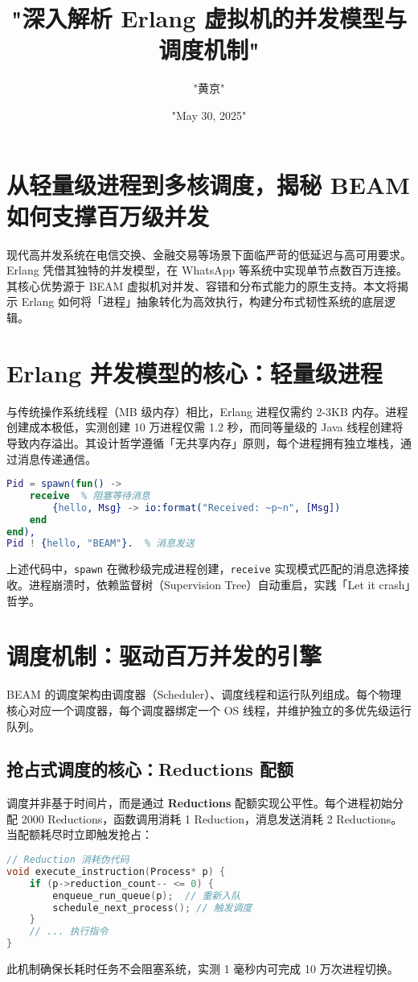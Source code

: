 \title{"深入解析 Erlang 虚拟机的并发模型与调度机制"}
\author{"黄京"}
\date{"May 30, 2025"}
\maketitle
\chapter{从轻量级进程到多核调度，揭秘 BEAM 如何支撑百万级并发}
现代高并发系统在电信交换、金融交易等场景下面临严苛的低延迟与高可用要求。Erlang 凭借其独特的并发模型，在 WhatsApp 等系统中实现单节点数百万连接。其核心优势源于 BEAM 虚拟机对并发、容错和分布式能力的原生支持。本文将揭示 Erlang 如何将「进程」抽象转化为高效执行，构建分布式韧性系统的底层逻辑。\par
\chapter{Erlang 并发模型的核心：轻量级进程}
与传统操作系统线程（MB 级内存）相比，Erlang 进程仅需约 2-3KB 内存。进程创建成本极低，实测创建 10 万进程仅需 1.2 秒，而同等量级的 Java 线程创建将导致内存溢出。其设计哲学遵循「无共享内存」原则，每个进程拥有独立堆栈，通过消息传递通信。\par
\begin{lstlisting}[language=erlang]
% 进程创建示例
Pid = spawn(fun() -> 
    receive  % 阻塞等待消息
        {hello, Msg} -> io:format("Received: ~p~n", [Msg])
    end
end),
Pid ! {hello, "BEAM"}.  % 消息发送
\end{lstlisting}
上述代码中，\texttt{spawn} 在微秒级完成进程创建，\texttt{receive} 实现模式匹配的消息选择接收。进程崩溃时，依赖监督树（Supervision Tree）自动重启，实践「Let it crash」哲学。\par
\chapter{调度机制：驱动百万并发的引擎}
BEAM 的调度架构由调度器（Scheduler）、调度线程和运行队列组成。每个物理核心对应一个调度器，每个调度器绑定一个 OS 线程，并维护独立的多优先级运行队列。\par
\section{抢占式调度的核心：Reductions 配额}
调度并非基于时间片，而是通过 \textbf{Reductions} 配额实现公平性。每个进程初始分配 2000 Reductions，函数调用消耗 1 Reduction，消息发送消耗 2 Reductions。当配额耗尽时立即触发抢占：\par
\begin{lstlisting}[language=c]
// Reduction 消耗伪代码
void execute_instruction(Process* p) {
    if (p->reduction_count-- <= 0) { 
        enqueue_run_queue(p);  // 重新入队
        schedule_next_process(); // 触发调度
    }
    // ... 执行指令
}
\end{lstlisting}
此机制确保长耗时任务不会阻塞系统，实测 1 毫秒内可完成 10 万次进程切换。\par

